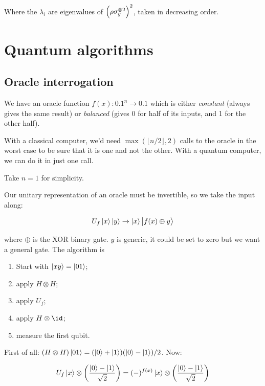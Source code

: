 \documentclass[main.tex]{subfiles}
\begin{document}
Where the \(\lambda_i\) are eigenvalues of \( \qty(\rho \sigma_y ^{\otimes 2})^2 \), taken in decreasing order.

\section{Quantum algorithms}

\subsection{Oracle interrogation}

We have an oracle function \(f(x): \qty{0,1}^n \rightarrow \qty{0,1}\) which is either \emph{constant} (always gives the same result) or \emph{balanced} (gives 0 for half of its inputs, and 1 for the other half).

With a classical computer, we'd need \(\max(\lfloor n/2 \rfloor,2)\) calls to the oracle in the worst case to be sure that it is one and not the other. With a quantum computer, we can do it in just one call.

Take \(n=1\) for simplicity.

Our unitary representation of an oracle must be invertible, so we take the input along:

\begin{equation}
    U_f \ket{x} \ket{y} \rightarrow \ket{x} \ket{f(x) \oplus y}
\end{equation}

where \(\oplus\) is the XOR binary gate. \(y\) is generic, it could be set to zero but we want a general gate. The algorithm is

\begin{enumerate}
    \item Start with \(\ket{xy} = \ket{01}\);
    \item apply \(H \otimes H\);
    \item apply \(U_f\);
    \item apply \(H \otimes \id\);
    \item measure the first qubit.
\end{enumerate}

First of all: \((H \otimes H) \ket{01} = (\ket{0} + \ket{1})(\ket{0} - \ket{1} )/2\). Now:

\begin{equation}
    U_f \ket{x} \otimes\qty(\frac{\ket{0} - \ket{1}}{\sqrt{2} }) = (-)^{f(x)} \ket{x} \otimes
    \qty(\frac{\ket{0} - \ket{1}}{\sqrt{2}})
\end{equation}
\end{document}

